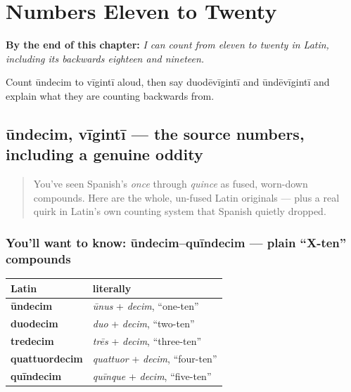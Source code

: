 
\chapter{Numbers Eleven to Twenty}
\label{ch:la-numbers-eleven-to-twenty}

\begin{chapteropening}
\textbf{By the end of this chapter:} \emph{I can count from eleven to twenty in Latin, including its backwards eighteen and nineteen.}

Count ūndecim to vīgintī aloud, then say duodēvīgintī and ūndēvīgintī and explain what they are counting backwards from.
\end{chapteropening}

\section[ūndecim — vīgintī]{ūndecim, vīgintī — the source numbers, including a genuine oddity}

\label{lesson:LA-C16-undecim-viginti}



\begin{quote}
You've seen Spanish's \emph{once} through \emph{quince} as fused, worn-down compounds. Here are the whole, un-fused Latin originals — plus a real quirk in Latin's own counting system that Spanish quietly dropped.
\end{quote}

\subsection*{You'll want to know: ūndecim–quīndecim — plain \textquotedblleft{}X-ten\textquotedblright{} compounds}
\noindent
\begin{tabularx}{\linewidth}{@{}>{\raggedright\arraybackslash}X>{\raggedright\arraybackslash}X@{}}
\toprule
\textbf{Latin} & \textbf{literally} \\
\midrule
\textbf{ūndecim} & \emph{ūnus} + \emph{decim}, \textquotedblleft{}one-ten\textquotedblright{} \\
\textbf{duodecim} & \emph{duo} + \emph{decim}, \textquotedblleft{}two-ten\textquotedblright{} \\
\textbf{tredecim} & \emph{trēs} + \emph{decim}, \textquotedblleft{}three-ten\textquotedblright{} \\
\textbf{quattuordecim} & \emph{quattuor} + \emph{decim}, \textquotedblleft{}four-ten\textquotedblright{} \\
\textbf{quīndecim} & \emph{quīnque} + \emph{decim}, \textquotedblleft{}five-ten\textquotedblright{} \\
\bottomrule
\end{tabularx}

